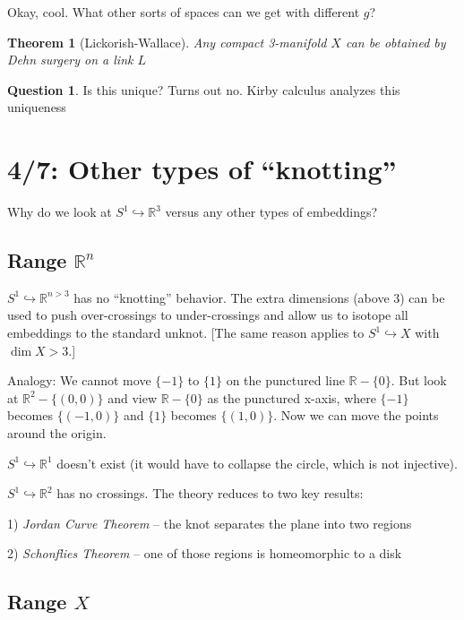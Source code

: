 \documentclass[11pt]{article}
\newcommand{\R}{\mathbb{R}}
\theoremstyle{plain}
\newtheorem{thm}{Theorem}
\theoremstyle{definition}
\newtheorem{question}{Question}
\begin{document}
Okay, cool. What other sorts of spaces can we get with different $g$?

\begin{thm}[Lickorish-Wallace]
  Any compact 3-manifold $X$ can be obtained by Dehn surgery on a link $L$
\end{thm}

\begin{question}
  Is this unique? Turns out no. Kirby calculus analyzes this uniqueness
\end{question}


\clearpage
\section{4/7: Other types of ``knotting''}

Why do we look at $S^1\hookrightarrow\R^3$ versus any other types of embeddings?


\subsection{Range $\R^n$}

$S^1\hookrightarrow\R^{n>3}$ has no ``knotting'' behavior. The extra dimensions (above 3) can be used to push over-crossings to under-crossings and allow us to isotope all embeddings to the standard unknot. [The same reason applies to $S^1\hookrightarrow X$ with $\dim X>3$.]

Analogy: We cannot move $\lbrace-1\rbrace$ to $\lbrace 1\rbrace$ on the punctured line $\R-\lbrace0\rbrace$. But look at $\R^2-\lbrace(0,0)\rbrace$ and view $\R-\lbrace0\rbrace$ as the punctured x-axis, where $\lbrace-1\rbrace$ becomes $\lbrace(-1,0)\rbrace$ and $\lbrace1\rbrace$ becomes $\lbrace(1,0)\rbrace$. Now we can move the points around the origin.

\bigskip
$S^1\hookrightarrow \R^1$ doesn't exist (it would have to collapse the circle, which is not injective).

\bigskip
$S^1\hookrightarrow \R^2$ has no crossings. The theory reduces to two key results:

1) \textit{Jordan Curve Theorem} -- the knot separates the plane into two regions

2) \textit{Schonflies Theorem} -- one of those regions is homeomorphic to a disk


\subsection{Range $X$}
\end{document}
